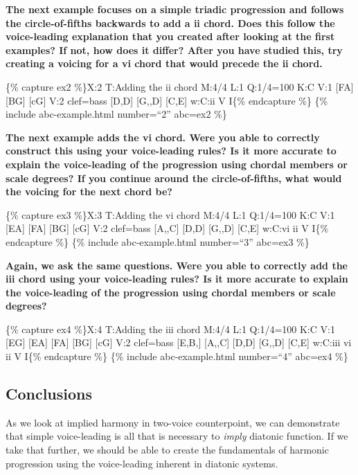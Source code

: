 \documentclass{book}
\begin{document}
\textbf{The next example focuses on a simple triadic progression and follows
the circle-of-fifths backwards to add a ii chord. Does this follow the
voice-leading explanation that you created after looking at the first
examples? If not, how does it differ? After you have studied this, try
creating a voicing for a vi chord that would precede the ii chord.}

\{\% capture ex2 \%\}X:2 T:Adding the ii chord M:4/4 L:1 Q:1/4=100 K:C V:1
{[}FA{]}\textbar{} {[}BG{]}\textbar{} {[}cG{]}\textbar{]} V:2 clef=bass
{[}D,D{]}\textbar{} {[}G,,D{]}\textbar{} {[}C,E{]}\textbar{]} w:C:ii V I\{\%
endcapture \%\} \{\% include abc-example.html number=``2'' abc=ex2 \%\}

\textbf{The next example adds the vi chord. Were you able to correctly
construct this using your voice-leading rules? Is it more accurate to explain
the voice-leading of the progression using chordal members or scale degrees?
If you continue around the circle-of-fifths, what would the voicing for the
next chord be?}

\{\% capture ex3 \%\}X:3 T:Adding the vi chord M:4/4 L:1 Q:1/4=100 K:C V:1
{[}EA{]}\textbar{} {[}FA{]}\textbar{} {[}BG{]}\textbar{} {[}cG{]}\textbar{]}
V:2 clef=bass {[}A,,C{]}\textbar{} {[}D,D{]}\textbar{} {[}G,,D{]}\textbar{}
{[}C,E{]}\textbar{]} w:C:vi ii V I\{\% endcapture \%\} \{\% include
abc-example.html number=``3'' abc=ex3 \%\}

\textbf{Again, we ask the same questions. Were you able to correctly add the
iii chord using your voice-leading rules? Is it more accurate to explain the
voice-leading of the progression using chordal members or scale degrees?}

\{\% capture ex4 \%\}X:4 T:Adding the iii chord M:4/4 L:1 Q:1/4=100 K:C V:1
{[}EG{]}\textbar{} {[}EA{]}\textbar{} {[}FA{]}\textbar{} {[}BG{]}\textbar{}
{[}cG{]}\textbar{]} V:2 clef=bass {[}E,B,{]}\textbar{} {[}A,,C{]}\textbar{}
{[}D,D{]}\textbar{} {[}G,,D{]}\textbar{} {[}C,E{]}\textbar{]} w:C:iii vi ii V
I\{\% endcapture \%\} \{\% include abc-example.html number=``4'' abc=ex4 \%\}

\hypertarget{conclusions-2}{%
\subsection{Conclusions}\label{conclusions-2}}

As we look at implied harmony in two-voice counterpoint, we can demonstrate
that simple voice-leading is all that is necessary to \emph{imply} diatonic
function. If we take that further, we should be able to create the
fundamentals of harmonic progression using the voice-leading inherent in
diatonic systems.
\end{document}
